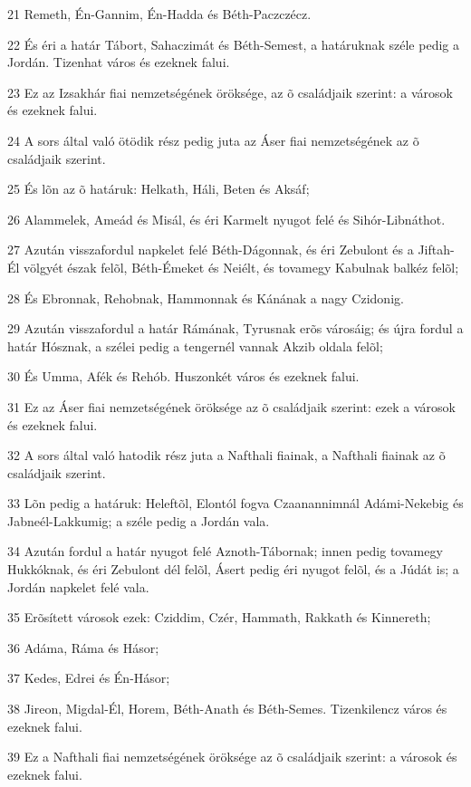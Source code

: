 \par 21 Remeth, Én-Gannim, Én-Hadda és Béth-Paczczécz.
\par 22 És éri a határ Tábort, Sahaczimát és Béth-Semest, a határuknak széle pedig a Jordán. Tizenhat város és ezeknek falui.
\par 23 Ez az Izsakhár fiai nemzetségének öröksége, az õ családjaik szerint: a városok és ezeknek falui.
\par 24 A sors által való ötödik rész pedig juta az Áser fiai nemzetségének az õ családjaik szerint.
\par 25 És lõn az õ határuk: Helkath, Háli, Beten és Aksáf;
\par 26 Alammelek, Ameád és Misál, és éri Karmelt nyugot felé és Sihór-Libnáthot.
\par 27 Azután visszafordul napkelet felé Béth-Dágonnak, és éri Zebulont és a Jiftah-Él völgyét észak felõl, Béth-Émeket és Neiélt, és tovamegy Kabulnak balkéz felõl;
\par 28 És Ebronnak, Rehobnak, Hammonnak és Kánának a nagy Czidonig.
\par 29 Azután visszafordul a határ Rámának, Tyrusnak erõs városáig; és újra fordul a határ Hósznak, a szélei pedig a tengernél vannak Akzib oldala felõl;
\par 30 És Umma, Afék és Rehób. Huszonkét város és ezeknek falui.
\par 31 Ez az Áser fiai nemzetségének öröksége az õ családjaik szerint: ezek a városok és ezeknek falui.
\par 32 A sors által való hatodik rész juta a Nafthali fiainak, a Nafthali fiainak az õ családjaik szerint.
\par 33 Lõn pedig a határuk: Heleftõl, Elontól fogva Czaanannimnál Adámi-Nekebig és Jabneél-Lakkumig; a széle pedig a Jordán vala.
\par 34 Azután fordul a határ nyugot felé Aznoth-Tábornak; innen pedig tovamegy Hukkóknak, és éri Zebulont dél felõl, Ásert pedig éri nyugot felõl, és a Júdát is; a Jordán napkelet felé vala.
\par 35 Erõsített városok ezek: Cziddim, Czér, Hammath, Rakkath és Kinnereth;
\par 36 Adáma, Ráma és Hásor;
\par 37 Kedes, Edrei és Én-Hásor;
\par 38 Jireon, Migdal-Él, Horem, Béth-Anath és Béth-Semes. Tizenkilencz város és ezeknek falui.
\par 39 Ez a Nafthali fiai nemzetségének öröksége az õ családjaik szerint: a városok és ezeknek falui.
